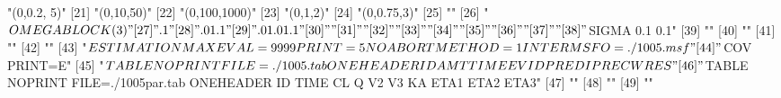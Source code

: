 \begin{Schunk}
\begin{Soutput}
[20] "(0,0.2, 5)"                                                                      
[21] "(0,10,50)"                                                                       
[22] "(0,100,1000)"                                                                    
[23] "(0,1,2)"                                                                         
[24] "(0,0.75,3)"                                                                      
[25] ""                                                                                
[26] "$OMEGA BLOCK(3)"                                                                 
[27] ".1"                                                                              
[28] ".01 .1"                                                                          
[29] ".01 .01 .1"                                                                      
[30] ""                                                                                
[31] ""                                                                                
[32] ""                                                                                
[33] ""                                                                                
[34] ""                                                                                
[35] ""                                                                                
[36] ""                                                                                
[37] ""                                                                                
[38] "$SIGMA 0.1 0.1"                                                                  
[39] ""                                                                                
[40] ""                                                                                
[41] ""                                                                                
[42] ""                                                                                
[43] "$ESTIMATION MAXEVAL=9999 PRINT=5 NOABORT METHOD=1 INTER MSFO=./1005.msf"         
[44] "$COV PRINT=E"                                                                    
[45] "$TABLE NOPRINT FILE=./1005.tab ONEHEADER ID AMT TIME EVID PRED IPRE CWRES"       
[46] "$TABLE NOPRINT FILE=./1005par.tab ONEHEADER ID TIME CL Q V2 V3 KA ETA1 ETA2 ETA3"
[47] ""                                                                                
[48] ""                                                                                
[49] ""                                                                                

\end{Soutput}
\end{Schunk}
